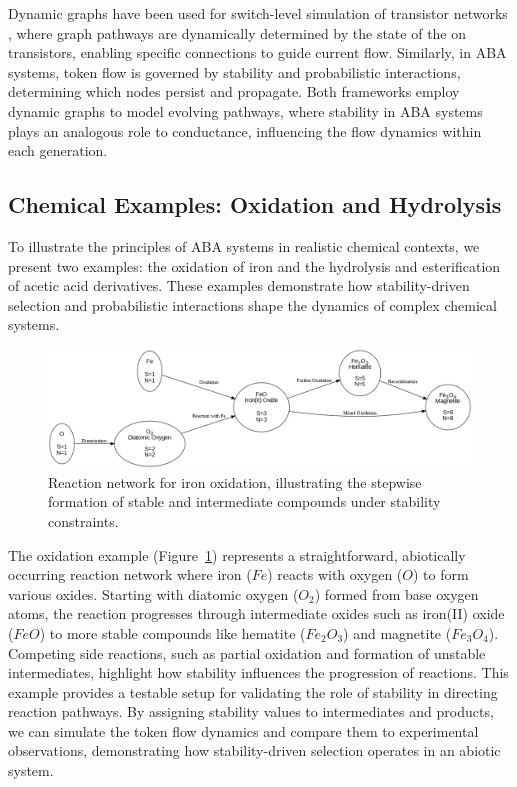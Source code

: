 \documentclass[entropy,article,submit,pdftex,oneauthor]{Definitions/mdpi}
\begin{document}
Dynamic graphs have been used for switch-level simulation of transistor networks \cite{AdlerCAD}, where graph pathways are dynamically determined by the state of the on transistors, enabling specific connections to guide current flow. Similarly, in ABA systems, token flow is governed by stability and probabilistic interactions, determining which nodes persist and propagate. Both frameworks employ dynamic graphs to model evolving pathways, where stability in ABA systems plays an analogous role to conductance, influencing the flow dynamics within each generation.

\subsection{Chemical Examples: Oxidation and Hydrolysis}

To illustrate the principles of ABA systems in realistic chemical contexts, we present two examples: the oxidation of iron and the hydrolysis and esterification of acetic acid derivatives. These examples demonstrate how stability-driven selection and probabilistic interactions shape the dynamics of complex chemical systems.

\begin{figure}[h]
    \centering
    \includegraphics[width=1\textwidth]{abc_oxi.png}
    \caption{Reaction network for iron oxidation, illustrating the stepwise formation of stable and intermediate compounds under stability constraints.}
    \label{fig:abc_oxi}
\end{figure}

The oxidation example (Figure~\ref{fig:abc_oxi}) represents a straightforward, abiotically occurring reaction network where iron (\(Fe\)) reacts with oxygen (\(O\)) to form various oxides. Starting with diatomic oxygen (\(O_2\)) formed from base oxygen atoms, the reaction progresses through intermediate oxides such as iron(II) oxide (\(FeO\)) to more stable compounds like hematite (\(Fe_2O_3\)) and magnetite (\(Fe_3O_4\)). Competing side reactions, such as partial oxidation and formation of unstable intermediates, highlight how stability influences the progression of reactions. This example provides a testable setup for validating the role of stability in directing reaction pathways. By assigning stability values to intermediates and products, we can simulate the token flow dynamics and compare them to experimental observations, demonstrating how stability-driven selection operates in an abiotic system.
\end{document}
